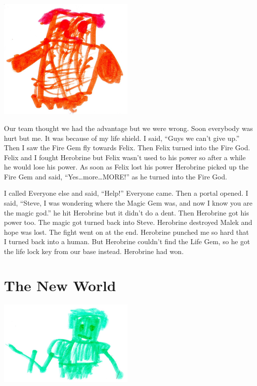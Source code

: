 \documentclass[12pt,twoside]{krantz}
\begin{document}
\includegraphics[width=2.60417in,height=\textheight]{img/herobrine-returns/15-orangeguy.jpg}

Our team thought we had the advantage but we were wrong. Soon everybody
was hurt but me. It was because of my life shield. I said, ``Guys we
can't give up.'' Then I saw the Fire Gem fly towards Felix. Then Felix
turned into the Fire God. Felix and I fought Herobrine but Felix wasn't
used to his power so after a while he would lose his power. As soon as
Felix lost his power Herobrine picked up the Fire Gem and said,
``Yes\ldots{}more\ldots{}MORE!'' as he turned into the Fire God.

I called Everyone else and said, ``Help!'' Everyone came. Then a portal
opened. I said, ``Steve, I was wondering where the Magic Gem was, and
now I know you are the magic god.'' he hit Herobrine but it didn't do a
dent. Then Herobrine got his power too. The magic got turned back into
Steve. Herobrine destroyed Malek and hope was lost. The fight went on at
the end. Herobrine punched me so hard that I turned back into a human.
But Herobrine couldn't find the Life Gem, so he got the life lock key
from our base instead. Herobrine had won.

\hypertarget{the-new-world}{%
\section{The New World}\label{the-new-world}}

\includegraphics[width=2.60417in,height=\textheight]{img/herobrine-returns/17-greenguy.jpg}
\end{document}
